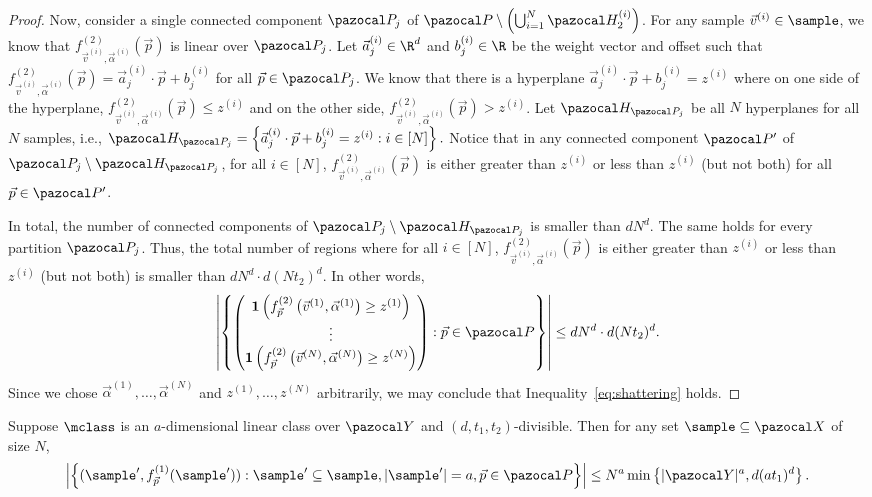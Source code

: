 \begin{proof}
Now, consider a single connected component $\pspace_j$ of $\pspace \setminus \left(\bigcup_{i = 1}^N \hyp^{(i)}_2\right)$. For any sample $\vec{v}^{(i)} \in \sample$, 
we know that $f^{(2)}_{\vec{v}^{(i)}, \vec{\alpha}^{(i)}}\left(\vec{p}\right)$ is linear over $\pspace_j$. 
Let $\vec{a}_j^{(i)} \in \R^d$ and $b_j^{(i)} \in \R$ be the weight vector and offset 
such that $f^{(2)}_{\vec{v}^{(i)}, \vec{\alpha}^{(i)}}\left(\vec{p}\right) = \vec{a}_j^{(i)} \cdot \vec{p} + b_j^{(i)}$ for all $\vec{p} \in \pspace_j$. We know that there is a hyperplane $\vec{a}_j^{(i)} \cdot \vec{p} + b_j^{(i)} = z^{(i)}$ where on one side of the 
hyperplane, $f^{(2)}_{\vec{v}^{(i)}, \vec{\alpha}^{(i)}}\left(\vec{p}\right) \leq z^{(i)}$ and on the other 
side, $f^{(2)}_{\vec{v}^{(i)}, \vec{\alpha}^{(i)}}\left(\vec{p}\right) > z^{(i)}$.
Let $\hyp_{\pspace_j}$ be all $N$ hyperplanes for all $N$ samples, i.e., $\hyp_{\pspace_j} = \left\{\vec{a}_j^{(i)} \cdot \vec{p} + b_j^{(i)} = z^{(i)} : i \in [N]\right\}.$ Notice that in any 
connected component $\pspace'$ of $\pspace_j \setminus \hyp_{\pspace_j}$, for all $i \in [N]$, $f^{(2)}_{\vec{v}^{(i)}, \vec{\alpha}^{(i)}}\left(\vec{p}\right)$ is either greater than $z^{(i)}$ or 
less than $z^{(i)}$ (but not both) for all $\vec{p} \in \pspace'$. 

In total, the number of 
connected components of $\pspace_j \setminus \hyp_{\pspace_j}$ is smaller than $dN^d$. 
The same holds for every partition $\pspace_j$. Thus, the total number of regions where 
for all $i \in [N]$, $f^{(2)}_{\vec{v}^{(i)}, \vec{\alpha}^{(i)}}\left(\vec{p}\right)$ is either greater 
than $z^{(i)}$ or less than $z^{(i)}$ (but not both) is smaller than $dN^d\cdot d(Nt_2)^d$. In other words, \[\left|\left\{\begin{pmatrix}
\textbf{1}\left(f^{(2)}_{\vec{p}}\left(\vec{v}^{(1)}, \vec{\alpha}^{(1)}\right) \geq z^{(1)}\right)\\
\vdots\\
\textbf{1}\left(f^{(2)}_{\vec{p}}\left(\vec{v}^{(N)}, \vec{\alpha}^{(N)}\right) \geq z^{(N)}\right)
\end{pmatrix} : \vec{p} \in \pspace\right\}\right| \leq dN^d\cdot d(Nt_2)^d.\] Since we chose $\vec{\alpha}^{(1)}, \dots, \vec{\alpha}^{(N)}$ and $z^{(1)}, \dots, z^{(N)}$ arbitrarily, we may conclude that Inequality~\eqref{eq:shattering} holds.
\end{proof}

\begin{lemma}\label{lem:f1labels}
Suppose $\mclass$ is an $a$-dimensional linear class over $\range$ and $(d,t_1, t_2)$-divisible. Then for any set $\sample \subseteq \domain$ of size $N$, \[\left|\left\{ (\sample', f^{(1)}_{\vec{p}}(\sample')) : \sample' \subseteq \sample, |\sample'| = a, \vec{p} \in \pspace\right\}\right| \leq N^a\min\left\{|\range|^a, d(at_1)^d\right\}.\]
\end{lemma}

